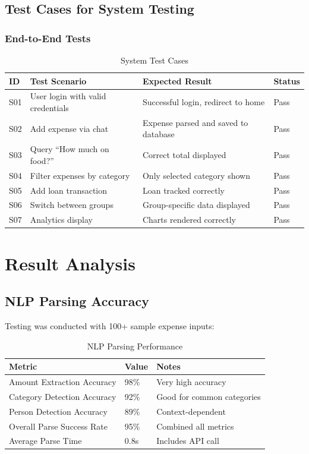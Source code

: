 \subsection{Test Cases for System Testing}

\subsubsection{End-to-End Tests}

\begin{table}[H]
\centering
\caption{System Test Cases}
\label{tab:system-tests}
\begin{tabular}{|p{1cm}|p{4cm}|p{4.5cm}|p{2.5cm}|}
\hline
\textbf{ID} & \textbf{Test Scenario} & \textbf{Expected Result} & \textbf{Status} \\
\hline
S01 & User login with valid credentials & Successful login, redirect to home & Pass \\
\hline
S02 & Add expense via chat & Expense parsed and saved to database & Pass \\
\hline
S03 & Query ``How much on food?'' & Correct total displayed & Pass \\
\hline
S04 & Filter expenses by category & Only selected category shown & Pass \\
\hline
S05 & Add loan transaction & Loan tracked correctly & Pass \\
\hline
S06 & Switch between groups & Group-specific data displayed & Pass \\
\hline
S07 & Analytics display & Charts rendered correctly & Pass \\
\hline
\end{tabular}
\end{table}

\section{Result Analysis}

\subsection{NLP Parsing Accuracy}

Testing was conducted with 100+ sample expense inputs:

\begin{table}[H]
\centering
\caption{NLP Parsing Performance}
\label{tab:nlp-performance}
\begin{tabular}{|p{5cm}|p{3cm}|p{4cm}|}
\hline
\textbf{Metric} & \textbf{Value} & \textbf{Notes} \\
\hline
Amount Extraction Accuracy & 98\% & Very high accuracy \\
\hline
Category Detection Accuracy & 92\% & Good for common categories \\
\hline
Person Detection Accuracy & 89\% & Context-dependent \\
\hline
Overall Parse Success Rate & 95\% & Combined all metrics \\
\hline
Average Parse Time & 0.8s & Includes API call \\
\hline
\end{tabular}
\end{table}

